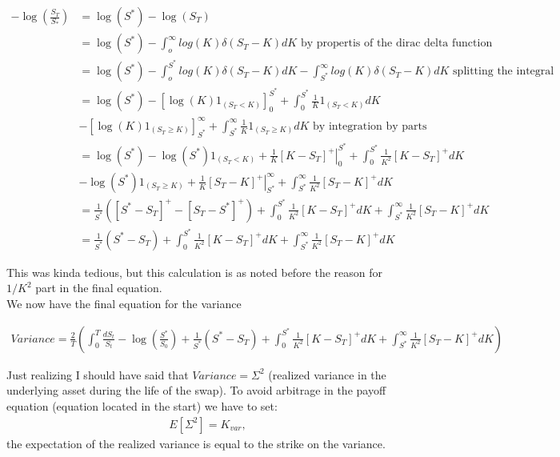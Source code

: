 \begin{align*}
-\log\left(\frac{S_T}{S_*}\right)&=\log (S^*)-\log (S_T)\\
&=\log (S^*)-\int_{o}^{\infty}log(K)\delta(S_T-K)dK\text{ by propertis of the dirac delta function}\\
&=\log (S^*)-\int_{o}^{S^*}log(K)\delta(S_T-K)dK-\int_{S^*}^{\infty}log(K)\delta(S_T-K)dK \text{ splitting the integral}\\
&=\log (S^*)-\left[\log(K)1_{(S_T<K)}\right]_0^{S^*}+\int_{0}^{S^*}\frac{1}{K}1_{(S_T<K)}dK\\
&-\left[\log(K)1_{(S_T\geq K)}\right]_{S^*}^{\infty}+\int_{S^*}^{\infty}\frac{1}{K}1_{(S_T\geq K)}dK\text{ by integration by parts}\\
&=\log (S^*)- \log(S^*)1_{(S_T<K)}+\left.\frac{1}{K}[K-S_T]^+\right|_0^{S^*}+\int_{0}^{S^*}\frac{1}{K^2}[K-S_T]^+dK\\
&-\log(S^*)1_{(S_T\geq K)}+\left.\frac{1}{K}[S_T-K]^+\right|_{S^*}^\infty+\int_{S^*}^{\infty}\frac{1}{K^2}[S_T-K]^+dK\\
&=\frac{1}{S^*}\left(\left[S^*-S_T\right]^+-\left[S_T-S^*\right]^+\right)
+\int_{0}^{S^*}\frac{1}{K^2}[K-S_T]^+dK+\int_{S^*}^{\infty}\frac{1}{K^2}[S_T-K]^+dK\\
&=\frac{1}{S^*}\left(S^*-S_T\right)
+\int_{0}^{S^*}\frac{1}{K^2}[K-S_T]^+dK+\int_{S^*}^{\infty}\frac{1}{K^2}[S_T-K]^+dK
\end{align*}

This was kinda tedious, but this calculation is as noted before the reason for $1/K^2$ part in the final equation.\\

We now have the final equation for the variance

\begin{align*}
Variance=\frac{2}{T}\left(\int_{0}^{T}\frac{dS_t}{S_t}-\log(\frac{S^*}{S_0})
+\frac{1}{S^*}\left(S^*-S_T\right)
+\int_{0}^{S^*}\frac{1}{K^2}[K-S_T]^+dK+\int_{S^*}^{\infty}\frac{1}{K^2}[S_T-K]^+dK
\right)
\end{align*}

Just realizing I should have said that $Variance = \Sigma^2$ (realized variance in the underlying asset during the life of the swap). To avoid arbitrage in the payoff equation (equation located in the start) we have to set:
\begin{align*}
E[\Sigma^2]=K_{var},
\end{align*}
the expectation of the realized variance is equal to the strike on the variance.

